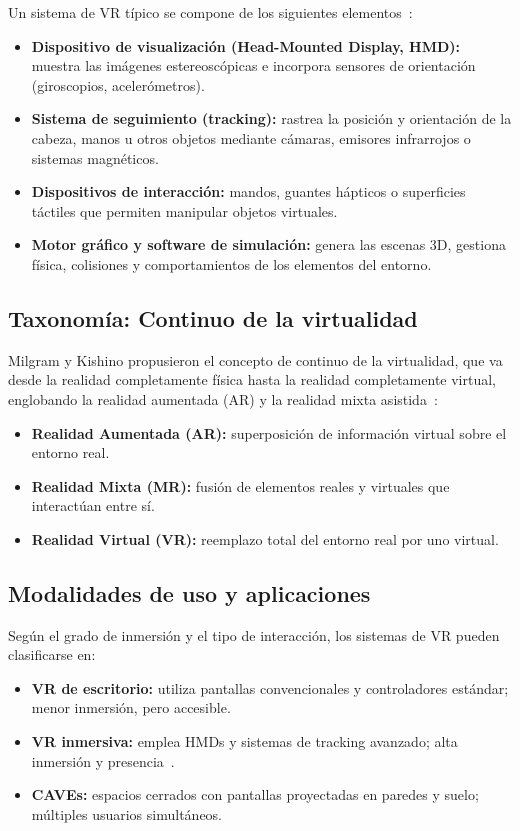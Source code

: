 Un sistema de VR típico se compone de los siguientes elementos~\cite{sherman2002,burdea2003}:
\begin{itemize}
  \item \textbf{Dispositivo de visualización (Head-Mounted Display, HMD):} muestra las imágenes estereoscópicas e incorpora sensores de orientación (giroscopios, acelerómetros).
  \item \textbf{Sistema de seguimiento (tracking):} rastrea la posición y orientación de la cabeza, manos u otros objetos mediante cámaras, emisores infrarrojos o sistemas magnéticos.
  \item \textbf{Dispositivos de interacción:} mandos, guantes hápticos o superficies táctiles que permiten manipular objetos virtuales.
  \item \textbf{Motor gráfico y software de simulación:} genera las escenas 3D, gestiona física, colisiones y comportamientos de los elementos del entorno.
\end{itemize}

\subsection{Taxonomía: Continuo de la virtualidad}

Milgram y Kishino propusieron el concepto de continuo de la virtualidad, que va desde la realidad completamente física hasta la realidad completamente virtual, englobando la realidad aumentada (AR) y la realidad mixta asistida~\cite{milgram94}:
\begin{itemize}
  \item \textbf{Realidad Aumentada (AR):} superposición de información virtual sobre el entorno real.
  \item \textbf{Realidad Mixta (MR):} fusión de elementos reales y virtuales que interactúan entre sí.
  \item \textbf{Realidad Virtual (VR):} reemplazo total del entorno real por uno virtual.
\end{itemize}

\subsection{Modalidades de uso y aplicaciones}

Según el grado de inmersión y el tipo de interacción, los sistemas de VR pueden clasificarse en:
\begin{itemize}
  \item \textbf{VR de escritorio:} utiliza pantallas convencionales y controladores estándar; menor inmersión, pero accesible.
  \item \textbf{VR inmersiva:} emplea HMDs y sistemas de tracking avanzado; alta inmersión y presencia~\cite{burdea2003}.
  \item \textbf{CAVEs:} espacios cerrados con pantallas proyectadas en paredes y suelo; múltiples usuarios simultáneos.
\end{itemize}

